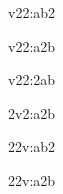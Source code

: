\documentclass[a4paper]{article}
\begin{document}
\makeatletter

\pgfplotspointonorientedsurfaceabmatchaxisline@ v22:ab2\pgfplots@EOI%

\pgfplotspointonorientedsurfaceabmatchaxisline@ v22:a2b\pgfplots@EOI%

\pgfplotspointonorientedsurfaceabmatchaxisline@ v22:2ab\pgfplots@EOI%
\pgfplotsassertequalstok{}{\pgfplots@loc@TMPa}{}



\pgfplotspointonorientedsurfaceabmatchaxisline@ 2v2:a2b\pgfplots@EOI%
\pgfplotsassertequalstok{}{\pgfplots@loc@TMPa}{}

\pgfplotspointonorientedsurfaceabmatchaxisline@ 22v:ab2\pgfplots@EOI%
\pgfplotsassertequalstok{}{\pgfplots@loc@TMPa}{}

\pgfplotspointonorientedsurfaceabmatchaxisline@ 22v:a2b\pgfplots@EOI%
\end{document}
